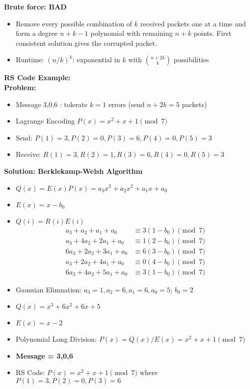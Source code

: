 \documentclass{article}\usepackage{amsmath,amssymb,amsthm,tikz,tkz-graph,color,chngpage,soul,hyperref,csquotes,graphicx,floatrow,polynom}\newcommand*{\QEDB}{\hfill\ensuremath{\square}}\newtheorem*{prop}{Proposition}\renewcommand{\theenumi}{\alph{enumi}}\usepackage[shortlabels]{enumitem}\usepackage[nobreak=true]{mdframed}\usetikzlibrary{matrix,calc}\MakeOuterQuote{"}\usepackage[margin=0.75in]{geometry} \newtheorem{theorem}{Theorem}
\begin{document}
\begin{mdframed}

\textbf{Brute force: BAD}
\begin{itemize}
\item Remove every possible combination of $k$ received packets one at a time and form a degree $n+k-1$ polynomial with remaining $n+k$ points. First consistent solution gives the corrupted packet.
\item Runtime: $(n/k)^k$: exponential in $k$ with $\binom{n+2k}{k}$ possibilities
\end{itemize}
\end{mdframed}

\begin{mdframed}
\textbf{RS Code Example:}\\
\textbf{Problem:}
\begin{itemize}
\item Message 3,0,6 : tolerate $k = 1$ errors (send $n+2k = 5$ packets)
\item Lagrange Encoding $P(x) = x^2 + x + 1 \pmod{7}$
\item Send: $P(1) = 3, P(2) = 0, P(3) = 6, P(4) = 0, P(5) = 3$
\item Receive: $R(1) = 3, R(2) = 1, R(3) = 6, R(4) = 0, R(5) = 3$
\end{itemize}
\textbf{Solution: Berklekamp-Welsh Algorithm}
\begin{itemize}
\item $Q(x) = E(x)P(x) = a_3x^3+a_2x^2+a_1x+a_0$
\item $E(x) = x-b_0$
\item $Q(i) = R(i)E(i)$
\begin{align*}
a_3+a_2+a_1+a_0 & \equiv 3(1-b_0) \pmod{7} \\
a_3+4a_2+2a_1+a_0 & \equiv 1(2-b_0) \pmod{7} \\
6a_3+2a_2+3a_1+a_0 & \equiv 6(3-b_0) \pmod{7} \\
a_3+2a_2+4a_1+a_0 & \equiv 0(4-b_0) \pmod{7} \\
6a_3+4a_2+5a_1+a_0 & \equiv 3(1-b_0) \pmod{7} 
\end{align*}
\item Gaussian Elimnation: $a_3=1, a_2=6, a_1=6, a_0=5$; $b_0=2$
\item $Q(x) = x^3+6x^2+6x+5$
\item $E(x)=x-2$
\item Polynomial Long Division: $P(x) = Q(x)/E(x) = x^2+x+1 \pmod{7}$\\
\item\textbf{Message = 3,0,6}
\item RS Code: $P(x) = x^2 + x + 1 \pmod{7}$ where $P(1) = 3, P(2) = 0, P(3) = 6$
\end{itemize}
\end{mdframed}
\end{document}
